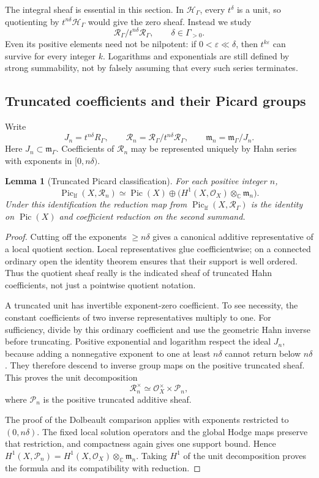 \documentclass[11pt,letterpaper]{article}
\numberwithin{equation}{section}
\newtheorem{lemma}[theorem]{Lemma}
\theoremstyle{definition}
\theoremstyle{remark}
\newcommand{\C}{\mathbb C}
\newcommand{\HH}{\mathcal H}
\newcommand{\RR}{\mathcal R}
\newcommand{\PP}{\mathcal P}
\newcommand{\OO}{\mathcal O}
\newcommand{\mm}{\mathfrak m}
\newcommand{\Pic}{\operatorname{Pic}}
\newcommand{\Piclf}{\operatorname{Pic}_{\mathrm{lf}}}
\newcommand{\Hg}{\HH_\Gamma}
\newcommand{\Rg}{\RR_\Gamma}
\newcommand{\rg}{R_\Gamma}
\newcommand{\mg}{\mm_\Gamma}
\newcommand{\ot}{\otimes_{\C}}
\newcommand{\eps}{\varepsilon}
\begin{document}
The integral sheaf is essential in this section. In $\Hg$, every
$t^\delta$ is a unit, so quotienting by $t^{n\delta}\Hg$ would give
the zero sheaf. Instead we study
\[
 \Rg/t^{n\delta}\Rg,\qquad \delta\in\Gamma_{>0}.
\]
Even its positive elements need not be nilpotent: if $0<\eps\ll\delta$,
then $t^{k\eps}$ can survive for every integer $k$. Logarithms and
exponentials are still defined by strong summability, not by falsely
assuming that every such series terminates.

\subsection{Truncated coefficients and their Picard groups}
Write
\[
 J_n=t^{n\delta}\rg,\qquad
 \RR_n=\Rg/t^{n\delta}\Rg,\qquad
 \mm_n=\mg/J_n.
\]
Here $J_n\subset\mg$. Coefficients of $\RR_n$ may be represented
uniquely by Hahn series with exponents in $[0,n\delta)$.

\begin{lemma}[Truncated Picard classification]
\label{lem:truncatedpic}
For each positive integer $n$,
\begin{equation}
 \Piclf(X,\RR_n)\simeq\Pic(X)
       \oplus\bigl(H^1(X,\OO_X)\ot\mm_n\bigr).
 \label{eq:truncatedpic}
\end{equation}
Under this identification the reduction map from
$\Piclf(X,\Rg)$ is the identity on $\Pic(X)$ and coefficient
reduction on the second summand.
\end{lemma}
\begin{proof}
Cutting off the exponents $\ge n\delta$ gives a canonical additive
representative of a local quotient section. Local representatives glue
coefficientwise; on a connected ordinary open the identity theorem
ensures that their support is well ordered. Thus the quotient sheaf
really is the indicated sheaf of truncated Hahn coefficients, not just
a pointwise quotient notation.

A truncated unit has invertible exponent-zero coefficient. To see
necessity, the constant coefficients of two inverse representatives
multiply to one. For sufficiency, divide by this ordinary coefficient
and use the geometric Hahn inverse before truncating. Positive
exponential and logarithm respect the ideal $J_n$, because adding a
nonnegative exponent to one at least $n\delta$ cannot return below
$n\delta$. They therefore descend to inverse group maps on the
positive truncated sheaf. This proves the unit decomposition
\[
 \RR_n^\times\simeq\OO_X^\times\times\PP_n,
\]
where $\PP_n$ is the positive truncated additive sheaf.

The proof of the Dolbeault comparison applies with exponents restricted
to $(0,n\delta)$. The fixed local solution operators and the global
Hodge maps preserve that restriction, and compactness again gives one
support bound. Hence
$H^1(X,\PP_n)=H^1(X,\OO_X)\ot\mm_n$.
Taking $H^1$ of the unit decomposition proves the formula and its
compatibility with reduction.
\end{proof}
\end{document}
